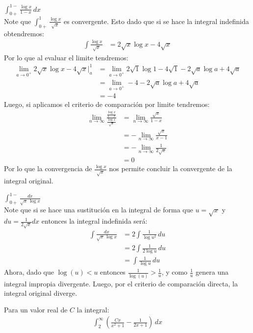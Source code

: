 \documentclass[../main.tex]{subfiles}
\begin{document}
\question $\int_{0 +}^{1-} \frac{\log x}{1-x} \, dx$\\
Note que $\int_{0+}^1 \frac{\log x}{\sqrt{x}}$ es convergente. Esto dado que si se hace la integral indefinida obtendremos:
\begin{align*}
    \int \frac{\log x}{\sqrt{x}} &= 2\sqrt{x}\log x - 4 \sqrt{x}
\end{align*}
Por lo que al evaluar el limite tendremos:
\begin{align*}
    \lim_{a \to 0^+} 2\sqrt{x}\log x - 4 \sqrt{x}|_{a}^1 &= \lim_{a \to 0^+} 2\sqrt{1}\log 1 - 4 \sqrt{1} - 2\sqrt{a}\log a + 4 \sqrt{a}\\
    &= \lim_{a \to 0^+} -4 - 2\sqrt{a}\log a + 4\sqrt{a}\\
    &= -4
\end{align*}
Luego, si aplicamos el criterio de comparación por limite tendremos:
\begin{align*}
    \lim_{n \to \infty} \frac{\frac{\log x}{1-x}}{\frac{\log x}{\sqrt{x}}} &= \lim_{n \to \infty} \frac{\sqrt{x}}{1-x}\\
    &= - \lim_{n \to \infty} \frac{\sqrt{x}}{x-1}\\
    &= - \lim_{n \to \infty} \frac{1}{2\sqrt{x}}\\
    &= 0
\end{align*}
Por lo que la convergencia de $\frac{\log x}{\sqrt{x}}$ nos permite concluir la convergente de la integral original.

\question $\int_{0 +}^{1-} \frac{dx}{\sqrt{x} \, \log x}$\\

Note que si se hace una sustitución en la integral de forma que $u = \sqrt{x}$ y $du = \frac{1}{2\sqrt{x}} dx$ entonces la integral indefinida será:
\begin{align*}
    \int \frac{dx}{\sqrt{x} \, \log x} &= 2\int \frac{1}{\log u^2} \, du\\
    &= 2\int \frac{1}{2\log u} \, du\\
    &= \int \frac{1}{\log u} \, du
\end{align*}
Ahora, dado que $\log(u) < u$ entonces $\frac{1}{\log(u)} > \frac{1}{u}$, y como $\frac{1}{u}$ genera una integral impropia divergente. Luego, por el criterio de comparación directa, la integral original diverge.

\question Para un valor real de $C$ la integral:
\begin{align*}
    \int_{2}^\infty \left(\frac{Cx}{x^2+1} - \frac{1}{2x+1}\right) \, dx
\end{align*}
\end{document}
